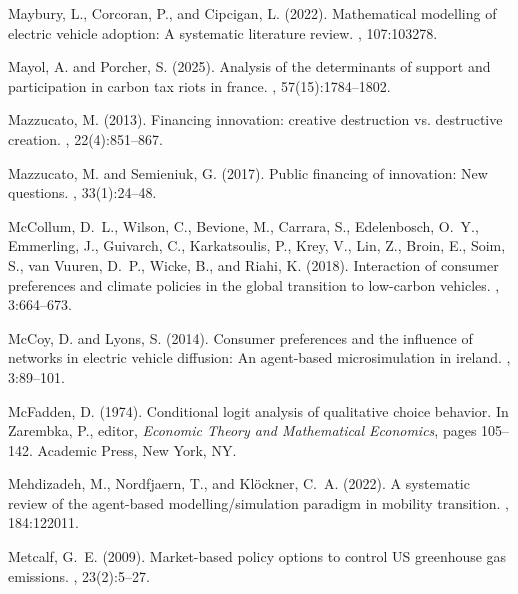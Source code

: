 \documentclass[12pt]{article}
\begin{document}
\begin{thebibliography}{}
Maybury, L., Corcoran, P., and Cipcigan, L. (2022).
\newblock Mathematical modelling of electric vehicle adoption: A systematic
  literature review.
,
  107:103278.

Mayol, A. and Porcher, S. (2025).
\newblock Analysis of the determinants of support and participation in carbon
  tax riots in france.
, 57(15):1784--1802.

Mazzucato, M. (2013).
\newblock Financing innovation: creative destruction vs. destructive creation.
, 22(4):851--867.

Mazzucato, M. and Semieniuk, G. (2017).
\newblock Public financing of innovation: New questions.
, 33(1):24--48.

McCollum, D.~L., Wilson, C., Bevione, M., Carrara, S., Edelenbosch, O.~Y.,
  Emmerling, J., Guivarch, C., Karkatsoulis, P., Krey, V., Lin, Z., Broin, E.,
  Soim, S., van Vuuren, D.~P., Wicke, B., and Riahi, K. (2018).
\newblock Interaction of consumer preferences and climate policies in the
  global transition to low-carbon vehicles.
, 3:664--673.

McCoy, D. and Lyons, S. (2014).
\newblock Consumer preferences and the influence of networks in electric
  vehicle diffusion: An agent-based microsimulation in ireland.
, 3:89--101.

McFadden, D. (1974).
\newblock Conditional logit analysis of qualitative choice behavior.
\newblock In Zarembka, P., editor, {\em Economic Theory and Mathematical
  Economics}, pages 105--142. Academic Press, New York, NY.

Mehdizadeh, M., Nordfjaern, T., and Kl{\"o}ckner, C.~A. (2022).
\newblock A systematic review of the agent-based modelling/simulation paradigm
  in mobility transition.
, 184:122011.

Metcalf, G.~E. (2009).
\newblock Market-based policy options to control {US} greenhouse gas emissions.
, 23(2):5--27.


\end{thebibliography}
\end{document}
